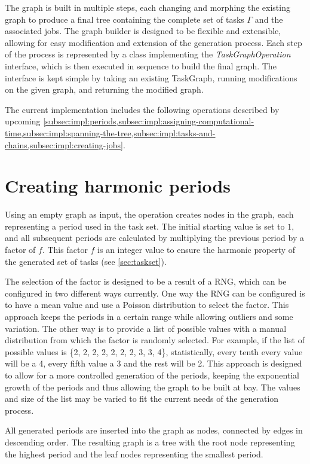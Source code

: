 The graph is built in multiple steps, each changing and morphing the existing graph to produce a final tree containing the complete set of tasks $\Gamma$ and the associated jobs.
The graph builder is designed to be flexible and extensible, allowing for easy modification and extension of the generation process.
Each step of the process is represented by a class implementing the \textit{TaskGraphOperation} interface, which is then executed in sequence to build the final graph.
The interface is kept simple by taking an existing TaskGraph, running modifications on the given graph, and returning the modified graph.

The current implementation includes the following operations described by upcoming \cref{subsec:impl:periods,subsec:impl:assigning-computational-time,subsec:impl:spanning-the-tree,subsec:impl:tasks-and-chains,subsec:impl:creating-jobs}.

\section{Creating harmonic periods}\label{subsec:impl:periods}
Using an empty graph as input, the operation creates nodes in the graph, each representing a period used in the task set.
The initial starting value is set to $1$, and all subsequent periods are calculated by multiplying the previous period by a factor of $f$.
This factor $f$ is an integer value to ensure the harmonic property of the generated set of tasks (see \cref{sec:taskset}).

The selection of the factor is designed to be a result of a \ac{RNG}, which can be configured in two different ways currently.
One way the \ac{RNG} can be configured is to have a mean value and use a Poisson distribution to select the factor.
This approach keeps the periods in a certain range while allowing outliers and some variation.
The other way is to provide a list of possible values with a manual distribution from which the factor is randomly selected.
For example, if the list of possible values is \{2, 2, 2, 2, 2, 2, 2, 3, 3, 4\}, statistically, every tenth every value will be a 4, every fifth value a 3 and the rest will be 2.
This approach is designed to allow for a more controlled generation of the periods, keeping the exponential growth of the periods and thus allowing the graph to be built at bay.
The values and size of the list may be varied to fit the current needs of the generation process.

All generated periods are inserted into the graph as nodes, connected by edges in descending order.
The resulting graph is a tree with the root node representing the highest period and the leaf nodes representing the smallest period.


